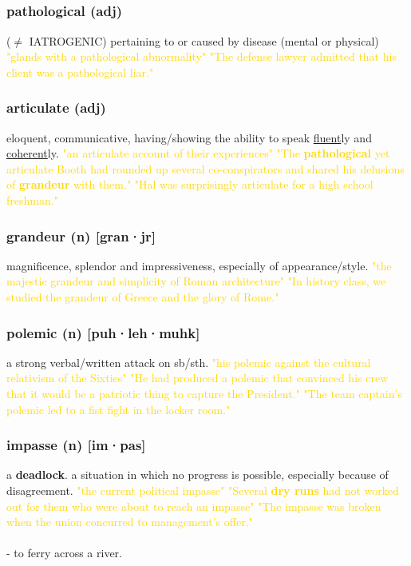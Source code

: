 \documentclass{proc}
\begin{document}
	\newpage
	\subsection{}
	\subsubsection{\textcolor{brickred}{pathological} (adj)}
	($\neq$ IATROGENIC) pertaining to or caused by disease (mental or physical)
	\textcolor{gold}{"glands with a pathological abnormality" "The defense lawyer admitted that his client was a pathological liar."}
	
	\subsubsection{\textcolor{brickred}{articulate} (adj)}
	eloquent, communicative, having/showing the ability to speak \underline{fluent}ly and \underline{coherent}ly.
	\textcolor{gold}{"an articulate account of their experiences" "The \textbf{pathological} yet articulate Booth had rounded up several co-conspirators and shared his delusions of \textbf{grandeur} with them." "Hal was surprisingly articulate for a  high school freshman."}
	
	\subsubsection{\textcolor{brickred}{grandeur} (n) [gran·jr]}
	magnificence, splendor and impressiveness, especially of appearance/style.
	\textcolor{gold}{"the majestic grandeur and simplicity of Roman architecture" "In history class, we studied the grandeur of Greece and the glory of Rome."}
	
	\subsubsection{\textcolor{brickred}{polemic} (n) [puh·leh·muhk]}
	a strong verbal/written attack on sb/sth.
	\textcolor{gold}{"his polemic against the cultural relativism of the Sixties" "He had produced a polemic that convinced his crew that it would be a patriotic thing to capture the President." "The team captain's polemic led to a fist fight in the locker room."}
	
	\subsubsection{\textcolor{brickred}{impasse} (n) [im·pas]}
	a \textbf{deadlock}. a situation in which no progress is possible, especially because of disagreement.
	\textcolor{gold}{"the current political impasse" "Several \textbf{dry runs} had not worked out for them who were about to reach an impasse" "The impasse was broken when the union concurred to management's offer."}\\\\
	- to ferry across a river.
	
\end{document}
